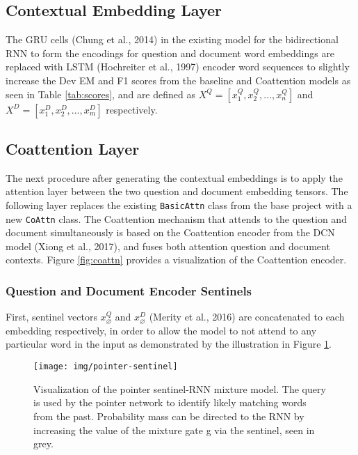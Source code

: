 \documentclass{article} %
\begin{document}
\subsection{Contextual Embedding Layer}

The GRU cells (Chung et al., 2014) in the existing model for the bidirectional RNN to form the encodings
for question and document word embeddings are replaced with LSTM (Hochreiter et al., 1997)
encoder word sequences to slightly increase the Dev EM and F1 scores from the baseline and
Coattention models as seen in Table \ref{tab:scores}, and are defined as
$X^Q = [x_1^Q , x_2^Q, ..., x_n^Q]$ and $X^D = [x_1^D , x_2^D, ..., x_m^D]$ respectively.

\subsection{Coattention Layer}

The next procedure after generating the contextual embeddings is to apply the attention
layer between the two question and document embedding tensors.
The following layer replaces the existing \texttt{BasicAttn} class from the base project
with a new \texttt{CoAttn} class.
The Coattention mechanism that attends to the question and document simultaneously
is based on the Coattention encoder from the DCN model (Xiong et al., 2017),
and fuses both attention question and document contexts.
Figure \ref{fig:coattn} provides a visualization of the Coattention encoder.


\subsubsection{Question and Document Encoder Sentinels}

First, sentinel vectors $x_\varnothing^Q$ and $x_\varnothing^D$ (Merity et al., 2016)
are concatenated to each embedding respectively,
in order to allow the model to not attend to any particular word in the input
as demonstrated by the illustration in Figure \ref{fig:pointer}.

\begin{center}%
\begin{figure}[h!]%
\hspace*{-1cm}%
\texttt{[image: img/pointer-sentinel]}
\caption{Visualization of the pointer sentinel-RNN mixture model. The query is used by the pointer network to identify likely matching words from the past. Probability mass can be directed to the RNN by increasing the value of the mixture gate g via the sentinel, seen in grey.}
\label{fig:pointer}
\hspace*{-1cm}%
\end{figure}
\end{center}%
\end{document}
